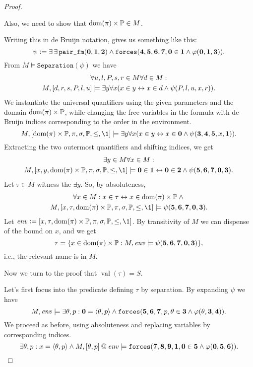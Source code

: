 \documentclass[11pt,english]{article}
\makeatletter
\renewcommand{\PP}{\mathbb{P}}
\newcommand{\forceisa}{\mathtt{forces}}
\newcommand{\concat}{\mathbin{@}}
\newcommand{\dB}[1]{\mathbf{#1}}
\DeclareMathOperator{\val}{val}
\makeatother
\begin{document}
\begin{proof}
\begin{framed}
    Also, we need to show that $\dom(\pi)\times\PP\in M$.
  \end{framed}
  Writing this in de Bruijn notation, gives us something like this:
  \[
  \psi \defi  \exists\,\exists\,\verb|pair_fm|(\dB{0},\dB{1},\dB{2}) \y
  \forceisa(\dB{4},\dB{5},\dB{6},\dB{7},\dB{0}\in \dB{1}\y\phi(\dB{0},\dB{1},\dB{3})).
  \]
  From $M\models \mathtt{Separation}(\psi)$ we have
  \begin{multline*}
    \forall u,l,P,s,r\in M \forall d\in M:\\ 
    M,[d,r,s,P,l,u] \models\exists y \forall x
    (x\in y \leftrightarrow x\in d \wedge \psi(P,l,u,x,r)).
  \end{multline*}
  We instantiate the universal quantifiers using the given parameters
  and the domain $\dom(\pi)\times\PP$, while changing the free variables in
  the formula with de Bruijn indices corresponding to the order in the
  environment.
  \[
  M,[\dom(\pi)\times\PP,\pi,\sig,\PP,\leq,\1] \models\exists y \forall x
  (x\in y \lsii x\in \dB{0} \y \psi(\dB{3},\dB{4},\dB{5},x,\dB{1})).
  \]
  Extracting the two outermost quantifiers and shifting indices, we get
  \begin{multline*}
    \exists y\in M \forall x\in M: \\
    M,[x,y,\dom(\pi)\times\PP,\pi,\sig,\PP,\leq,\1] \models
    \dB{0}\in \dB{1} \lsii \dB{0}\in \dB{2} \y \psi(\dB{5},\dB{6},\dB{7},\dB{0},\dB{3}).
  \end{multline*}
  Let $\tau\in M$ witness the $\exists y$. So, by absoluteness,
  \begin{multline*}
    \forall x\in M: 
    x\in\tau \lsii  x\in\dom(\pi)\times\PP \y{}\\ 
  M,[x,\tau,\dom(\pi)\times\PP,\pi,\sig,\PP,\leq,\1] \models
  \psi(\dB{5},\dB{6},\dB{7},\dB{0},\dB{3}).
  \end{multline*}
  Let $\mathit{env}\defi
  [x,\tau,\dom(\pi)\times\PP,\pi,\sig,\PP,\leq,\1]$. By transitivity
  of $M$ we can dispense of the bound on $x$, and we get
  \[
  \tau = \{x\in\dom(\pi)\times\PP :
  M, \mathit{env}\models
  \psi(\dB{5},\dB{6},\dB{7},\dB{0},\dB{3})\},
  \]
  i.e., the relevant name is in $M$.
  
  Now we turn to the proof that $\val(\tau)=S$.
  
  Let's first focus into the predicate defining $\tau$ by separation. By expanding $\psi$ we have
  \[
   M, \mathit{env}\models
   \exists \th,p : \dB{0}=\lb\th,p\rb \y
   \forceisa(\dB{5},\dB{6},\dB{7},p,\th\in \dB{3}\y\phi(\th,\dB{3},\dB{4})).
  \]
  We proceed as before, using absoluteness and replacing variables by
  corresponding indices.
  \[
  \exists \th,p : x =\lb\th,p\rb \y  M, [\th,p]\concat\mathit{env}\models
  \forceisa(\dB{7},\dB{8},\dB{9},\dB{1},\dB{0}\in \dB{5}\y\phi(\dB{0},\dB{5},\dB{6})).
  \]
    

\end{proof}
\end{document}
